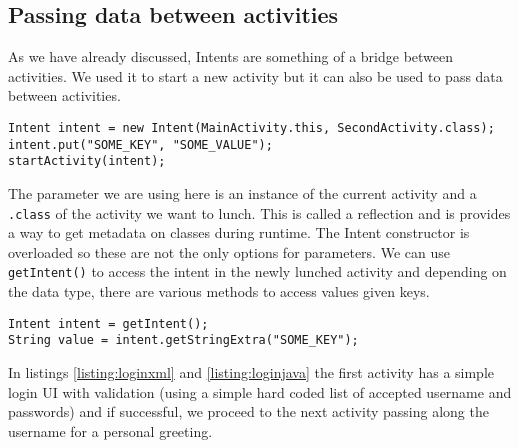 \subsection{Passing data between activities}
As we have already discussed, Intents are something of a bridge between activities. We used it to start a new activity but it can also be used to pass data between activities.

\begin{lstlisting}[style=A_Java]
Intent intent = new Intent(MainActivity.this, SecondActivity.class);
intent.put("SOME_KEY", "SOME_VALUE");
startActivity(intent);
\end{lstlisting}

The parameter we are using here is an instance of the current activity and a \texttt{.class} of the activity we want to lunch. This is called a reflection and is provides a way to get metadata on classes during runtime. The Intent constructor is overloaded so these are not the only options for parameters. We can use \texttt{getIntent()} to access the intent in the newly lunched activity and depending on the data type, there are various methods to access values given keys.

\begin{lstlisting}[style=A_Java]
Intent intent = getIntent();
String value = intent.getStringExtra("SOME_KEY");
\end{lstlisting}

In listings \ref{listing:loginxml} and \ref{listing:loginjava} the first activity has a simple login UI with validation (using a simple hard coded list of accepted username and passwords) and if successful, we proceed to the next activity passing along the username for a personal greeting.

